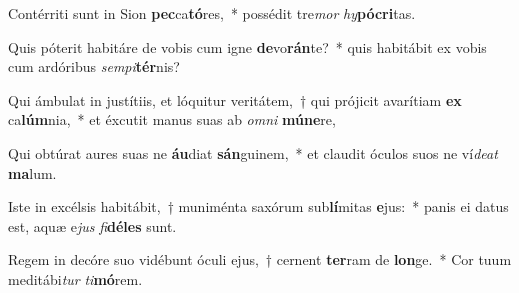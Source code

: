 \item Contérriti sunt in Sion \textbf{pec}ca\textbf{tó}res,~* possédit tre\textit{mor} \textit{hy}\textbf{pó}\textbf{cri}tas.
\item Quis póterit habitáre de vobis cum igne \textbf{de}vo\textbf{rán}te?~* quis habitábit ex vobis cum ardóribus \textit{sem}\textit{pi}\textbf{tér}nis?
\item Qui ámbulat in justítiis, et lóquitur veritátem,~† qui prójicit avarítiam \textbf{ex} ca\textbf{lúm}nia,~* et éxcutit manus suas ab \textit{om}\textit{ni} \textbf{mú}\textbf{ne}re,
\item Qui obtúrat aures suas ne \textbf{áu}diat \textbf{sán}guinem,~* et claudit óculos suos ne ví\textit{de}\textit{at} \textbf{ma}lum.
\item Iste in excélsis habitábit,~† muniménta saxórum sub\textbf{lí}mitas \textbf{e}jus:~* panis ei datus est, aquæ e\textit{jus} \textit{fi}\textbf{dé}\textbf{les} sunt.
\item Regem in decóre suo vidébunt óculi ejus,~† cernent \textbf{ter}ram de \textbf{lon}ge.~* Cor tuum meditábi\textit{tur} \textit{ti}\textbf{mó}rem.
